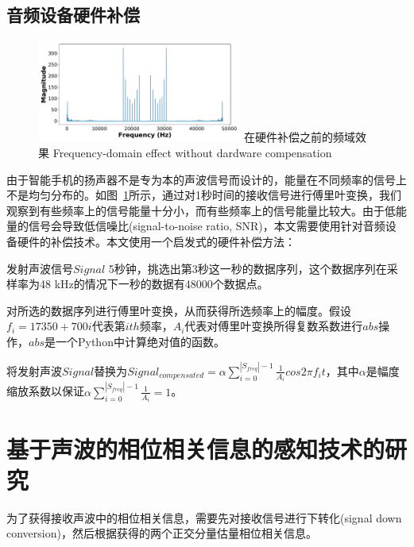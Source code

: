 \subsection{音频设备硬件补偿}

\begin{figure}[!htp]
  \centering
  \includegraphics[width=0.6\textwidth]{figure/nocompensation.pdf}
  \bicaption
    {在硬件补偿之前的频域效果}
    {Frequency-domain effect without dardware compensation}
  \label{fig:nocompensation}
\end{figure}

由于智能手机的扬声器不是专为本的声波信号而设计的，能量在不同频率的信号上不是均匀分布的。如图~\ref{fig:nocompensation}所示，通过对1秒时间的接收信号进行傅里叶变换，我们观察到有些频率上的信号能量十分小，而有些频率上的信号能量比较大。由于低能量的信号会导致低信噪比(signal-to-noise ratio, SNR)，本文需要使用针对音频设备硬件的补偿技术。本文使用一个启发式的硬件补偿方法：
\begin{enumerate*}[label=(\arabic*)]
    \item 发射声波信号$Signal$ 5秒钟，挑选出第3秒这一秒的数据序列，这个数据序列在采样率为48 kHz的情况下一秒的数据有48000个数据点。
    \item 对所选的数据序列进行傅里叶变换，从而获得所选频率上的幅度。假设$f_{i} = 17350 + 700i$代表第$ith$频率，$A_{i}$代表对傅里叶变换所得复数系数进行$abs$操作，$abs$是一个Python中计算绝对值的函数。
    \item 将发射声波$Signal$替换为$Signal_{compensated}=\alpha \sum_{i=0}^{|S_{freq}|-1} \frac{1}{A_i} cos 2\pi f_{i}t$，其中$\alpha$是幅度缩放系数以保证$\alpha \sum_{i=0}^{|S_{freq}|-1}\frac{1}{A_i}=1$。
\end{enumerate*}



\section{基于声波的相位相关信息的感知技术的研究}\label{sec:sensing-research}
为了获得接收声波中的相位相关信息，需要先对接收信号进行下转化(signal down conversion)，然后根据获得的两个正交分量估量相位相关信息。

